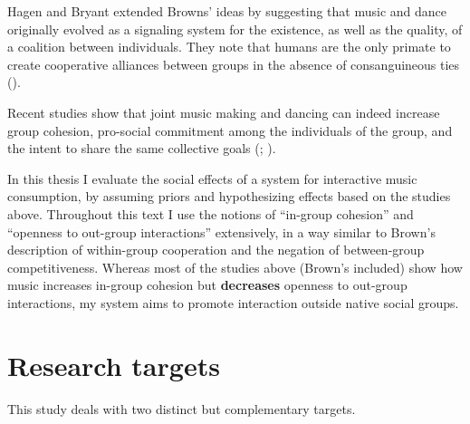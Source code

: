\documentclass[a4paper,11pt]{article}
\begin{document}
Hagen and Bryant extended Browns' ideas by suggesting that music and dance originally evolved as a signaling system for the existence, as well as the quality, of a coalition between individuals.
They note that humans are the only primate to create cooperative alliances between groups in the absence of consanguineous ties (\cite*{Hagen2003}).

Recent studies show that joint music making and dancing can indeed increase group cohesion, pro-social commitment among the individuals of the group, and the intent to share the same collective goals (\cite{Kirschner2010}; \cite{Knoblich2011}).

In this thesis I evaluate the social effects of a system for interactive music consumption, by assuming priors and hypothesizing effects based on the studies above.
Throughout this text I use the notions of ``in-group cohesion'' and ``openness to out-group interactions'' extensively, in a way similar to Brown's description of within-group cooperation and the negation of between-group competitiveness.
Whereas most of the studies above (Brown's included) show how music increases in-group cohesion but \textbf{decreases} openness to out-group interactions, my system aims to promote interaction outside native social groups.

\clearpage\section{Research targets}

This study deals with two distinct but complementary targets.
\end{document}
